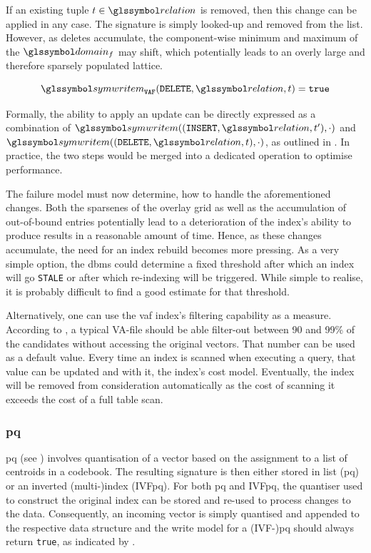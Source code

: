 If an existing tuple $t \in \relation$ is removed, then this change can be applied in any case. The signature is simply looked-up and removed from the list. However, as deletes accumulate, the component-wise minimum and maximum of the $\domain_f$ may shift, which potentially leads to an overly large and therefore sparsely populated lattice.

\begin{equation}
    \label{equation:write_model_delete_vaf}
    \symwritem_{\mathtt{VAF}}(\mathtt{DELETE}, \relation, t) = \mathtt{true}
\end{equation}

Formally, the ability to apply an update can be directly expressed as a combination of $ \symwritem((\mathtt{INSERT}, \relation, t^{\prime}),\cdot)$ and $ \symwritem((\mathtt{DELETE}, \relation, t), \cdot)$, as outlined in . In practice, the two steps would be merged into a dedicated operation to optimise performance.

The failure model must now determine, how to handle the aforementioned changes. Both the sparsenes of the overlay grid as well as the accumulation of out-of-bound entries potentially lead to a deterioration of the index's ability to produce results in a reasonable amount of time. Hence, as these changes accumulate, the need for an index rebuild becomes more pressing. As a very simple option, the \acrshort{dbms} could determine a fixed threshold after which an index will go \texttt{STALE} or after which re-indexing will be triggered. While simple to realise, it is probably difficult to find a good estimate for that threshold.

Alternatively, one can use the \acrshort{vaf} index's filtering capability as a measure. According to \cite{Weber:1998Va}, a typical VA-file should be able filter-out between 90 and 99\% of the candidates without accessing the original vectors. That number can be used as a default value. Every time an index is scanned when executing a query, that value can be updated and with it, the index's cost model. Eventually, the index will be removed from consideration automatically as the cost of scanning it exceeds the cost of a full table scan. 

\subsubsection{\texorpdfstring{\acrfull{pq}}{PQ}}
\acrshort{pq} (see  ) involves quantisation of a vector based on the assignment to a list of centroids in a codebook. The resulting signature is then either stored in list (\acrshort{pq}) or an inverted (multi-)index (IVF\acrshort{pq}). For both \acrshort{pq} and IVF\acrshort{pq}, the quantiser used to construct the original index can be stored and re-used to process changes to the data. Consequently, an incoming vector is simply quantised and appended to the respective data structure and the write model for a (IVF-)\acrshort{pq} should always return \texttt{true}, as indicated by .

